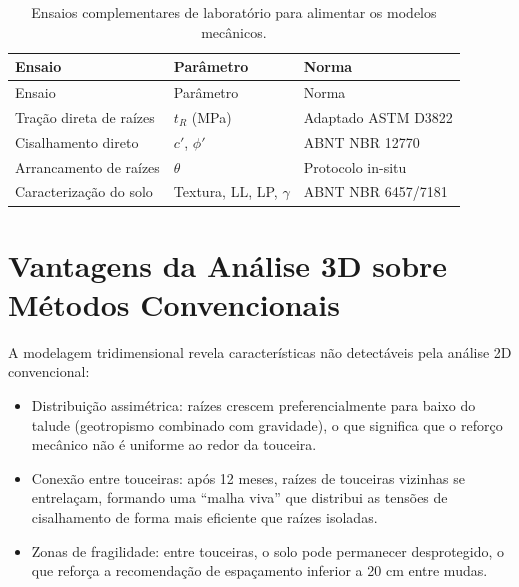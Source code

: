 \documentclass[
  portuguese,
  11pt,
  a4paper,
  open=any]{scrbook}
\begin{document}
\begin{longtable}[]{@{}
  >{\raggedright\arraybackslash}p{}
  >{\raggedright\arraybackslash}p{}
  >{\raggedright\arraybackslash}p{}@{}}
\caption{Ensaios complementares de laboratório para alimentar os modelos
mecânicos.}\label{tbl-ensaios-cap22}\tabularnewline
\toprule\noalign{}
\begin{minipage}[b]{\linewidth}\raggedright
Ensaio
\end{minipage} & \begin{minipage}[b]{\linewidth}\raggedright
Parâmetro
\end{minipage} & \begin{minipage}[b]{\linewidth}\raggedright
Norma
\end{minipage} \\
\midrule\noalign{}
\endfirsthead
\toprule\noalign{}
\begin{minipage}[b]{\linewidth}\raggedright
Ensaio
\end{minipage} & \begin{minipage}[b]{\linewidth}\raggedright
Parâmetro
\end{minipage} & \begin{minipage}[b]{\linewidth}\raggedright
Norma
\end{minipage} \\
\midrule\noalign{}
\endhead
\bottomrule\noalign{}
\endlastfoot
Tração direta de raízes & \(t_R\) (MPa) & Adaptado ASTM D3822 \\
Cisalhamento direto & \(c'\), \(\phi'\) & ABNT NBR 12770 \\
Arrancamento de raízes & \(\theta\) & Protocolo in-situ \\
Caracterização do solo & Textura, LL, LP, \(\gamma\) & ABNT NBR
6457/7181 \\
\end{longtable}

\section{Vantagens da Análise 3D sobre Métodos
Convencionais}\label{vantagens-da-anuxe1lise-3d-sobre-muxe9todos-convencionais}

A modelagem tridimensional revela características não detectáveis pela
análise 2D convencional:

\begin{itemize}
\item
  Distribuição assimétrica: raízes crescem preferencialmente para baixo
  do talude (geotropismo combinado com gravidade), o que significa que o
  reforço mecânico não é uniforme ao redor da touceira.
\item
  Conexão entre touceiras: após 12 meses, raízes de touceiras vizinhas
  se entrelaçam, formando uma ``malha viva'' que distribui as tensões de
  cisalhamento de forma mais eficiente que raízes isoladas.
\item
  Zonas de fragilidade: entre touceiras, o solo pode permanecer
  desprotegido, o que reforça a recomendação de espaçamento inferior a
  20 cm entre mudas.
\end{itemize}
\end{document}
